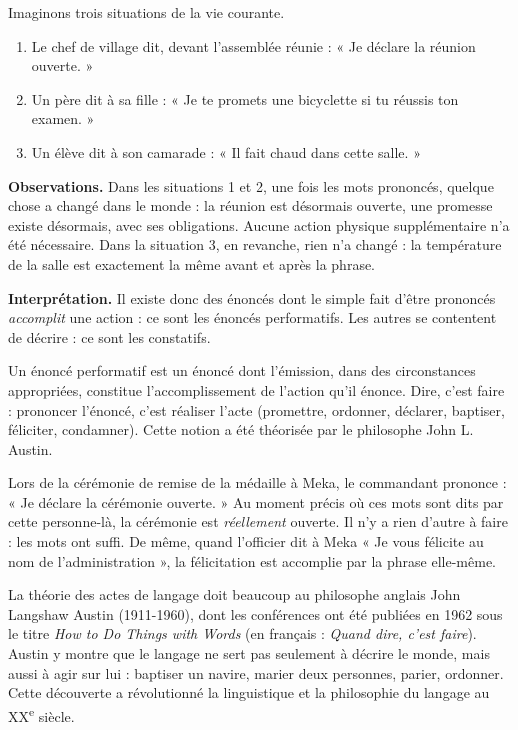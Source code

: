 \documentclass[11pt]{article}
\newcommand{\cle}[1]{{\popxbold\color{popdark}#1}}
\begin{document}
\begin{experience}
Imaginons trois situations de la vie courante.
\begin{enumerate}
\item Le chef de village dit, devant l'assemblée réunie : « Je déclare la réunion ouverte. »
\item Un père dit à sa fille : « Je te promets une bicyclette si tu réussis ton examen. »
\item Un élève dit à son camarade : « Il fait chaud dans cette salle. »
\end{enumerate}
\textbf{Observations.} Dans les situations 1 et 2, une fois les mots prononcés, quelque chose a changé dans le monde : la réunion est désormais ouverte, une promesse existe désormais, avec ses obligations. Aucune action physique supplémentaire n'a été nécessaire. Dans la situation 3, en revanche, rien n'a changé : la température de la salle est exactement la même avant et après la phrase.\par
\textbf{Interprétation.} Il existe donc des énoncés dont le simple fait d'être prononcés \emph{accomplit} une action : ce sont les énoncés performatifs. Les autres se contentent de décrire : ce sont les constatifs.
\end{experience}

\begin{definition}
Un énoncé \cle{performatif} est un énoncé dont l'émission, dans des circonstances appropriées, constitue l'accomplissement de l'action qu'il énonce. Dire, c'est faire : prononcer l'énoncé, c'est réaliser l'acte (promettre, ordonner, déclarer, baptiser, féliciter, condamner). Cette notion a été théorisée par le philosophe John L. \cle{Austin}.
\end{definition}

\begin{exemplebox}
Lors de la cérémonie de remise de la médaille à Meka, le commandant prononce : « Je déclare la cérémonie ouverte. » Au moment précis où ces mots sont dits par cette personne-là, la cérémonie est \emph{réellement} ouverte. Il n'y a rien d'autre à faire : les mots ont suffi. De même, quand l'officier dit à Meka « Je vous félicite au nom de l'administration », la félicitation est accomplie par la phrase elle-même.
\end{exemplebox}

\begin{savaistu}
La théorie des actes de langage doit beaucoup au philosophe anglais John Langshaw Austin (1911-1960), dont les conférences ont été publiées en 1962 sous le titre \emph{How to Do Things with Words} (en français : \emph{Quand dire, c'est faire}). Austin y montre que le langage ne sert pas seulement à décrire le monde, mais aussi à agir sur lui : baptiser un navire, marier deux personnes, parier, ordonner. Cette découverte a révolutionné la linguistique et la philosophie du langage au XX\textsuperscript{e} siècle.
\end{savaistu}
\end{document}
